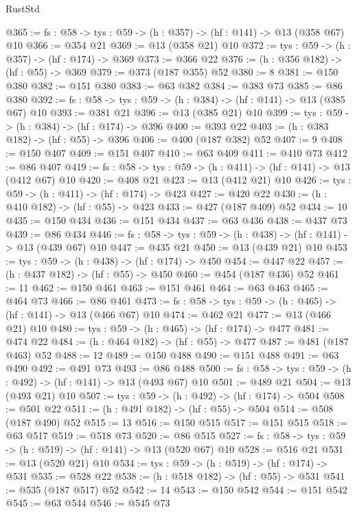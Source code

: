 \begin{lexlean}{RustStd}
\begin{coremodule}
@365 := {fs : @58} -> {tys : @59} -> (h : @357) -> (hf : @141) -> @13 (@358 @67) @10
@366 := @354 @21
@369 := @13 (@358 @21) @10
@372 := {tys : @59} -> (h : @357) -> (hf : @174) -> @369
@373 := @366 @22
@376 := (h : @356 @182) -> (hf : @55) -> @369
@379 := @373 (@187 @355) @52
@380 := 8
@381 := @150 @380
@382 := @151 @380
@383 := @63 @382
@384 := @383 @73
@385 := @86 @380
@392 := {fs : @58} -> {tys : @59} -> (h : @384) -> (hf : @141) -> @13 (@385 @67) @10
@393 := @381 @21
@396 := @13 (@385 @21) @10
@399 := {tys : @59} -> (h : @384) -> (hf : @174) -> @396
@400 := @393 @22
@403 := (h : @383 @182) -> (hf : @55) -> @396
@406 := @400 (@187 @382) @52
@407 := 9
@408 := @150 @407
@409 := @151 @407
@410 := @63 @409
@411 := @410 @73
@412 := @86 @407
@419 := {fs : @58} -> {tys : @59} -> (h : @411) -> (hf : @141) -> @13 (@412 @67) @10
@420 := @408 @21
@423 := @13 (@412 @21) @10
@426 := {tys : @59} -> (h : @411) -> (hf : @174) -> @423
@427 := @420 @22
@430 := (h : @410 @182) -> (hf : @55) -> @423
@433 := @427 (@187 @409) @52
@434 := 10
@435 := @150 @434
@436 := @151 @434
@437 := @63 @436
@438 := @437 @73
@439 := @86 @434
@446 := {fs : @58} -> {tys : @59} -> (h : @438) -> (hf : @141) -> @13 (@439 @67) @10
@447 := @435 @21
@450 := @13 (@439 @21) @10
@453 := {tys : @59} -> (h : @438) -> (hf : @174) -> @450
@454 := @447 @22
@457 := (h : @437 @182) -> (hf : @55) -> @450
@460 := @454 (@187 @436) @52
@461 := 11
@462 := @150 @461
@463 := @151 @461
@464 := @63 @463
@465 := @464 @73
@466 := @86 @461
@473 := {fs : @58} -> {tys : @59} -> (h : @465) -> (hf : @141) -> @13 (@466 @67) @10
@474 := @462 @21
@477 := @13 (@466 @21) @10
@480 := {tys : @59} -> (h : @465) -> (hf : @174) -> @477
@481 := @474 @22
@484 := (h : @464 @182) -> (hf : @55) -> @477
@487 := @481 (@187 @463) @52
@488 := 12
@489 := @150 @488
@490 := @151 @488
@491 := @63 @490
@492 := @491 @73
@493 := @86 @488
@500 := {fs : @58} -> {tys : @59} -> (h : @492) -> (hf : @141) -> @13 (@493 @67) @10
@501 := @489 @21
@504 := @13 (@493 @21) @10
@507 := {tys : @59} -> (h : @492) -> (hf : @174) -> @504
@508 := @501 @22
@511 := (h : @491 @182) -> (hf : @55) -> @504
@514 := @508 (@187 @490) @52
@515 := 13
@516 := @150 @515
@517 := @151 @515
@518 := @63 @517
@519 := @518 @73
@520 := @86 @515
@527 := {fs : @58} -> {tys : @59} -> (h : @519) -> (hf : @141) -> @13 (@520 @67) @10
@528 := @516 @21
@531 := @13 (@520 @21) @10
@534 := {tys : @59} -> (h : @519) -> (hf : @174) -> @531
@535 := @528 @22
@538 := (h : @518 @182) -> (hf : @55) -> @531
@541 := @535 (@187 @517) @52
@542 := 14
@543 := @150 @542
@544 := @151 @542
@545 := @63 @544
@546 := @545 @73

\end{coremodule}
\end{lexlean}
